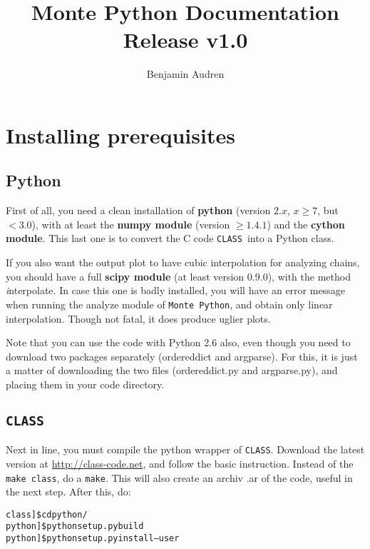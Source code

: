 \documentclass[10pt]{article}
\title{ {\huge \bf Monte Python Documentation}\\Release v1.0}
\author{Benjamin Audren}
\newcommand{\CLASS}{\texttt{CLASS}}
\newcommand{\MP}{\texttt{Monte Python}}
\begin{document}
\maketitle

\newpage

\tableofcontents

\newpage

\section{Installing prerequisites}

  \subsection{Python}

  First of all, you need a clean installation of {\bf python} (version $2.x$,
  $x\geq7$, but $<3.0$), with at least the {\bf numpy module} (version
  $\geq1.4.1$) and the {\bf cython module}. This last one is to convert the C
  code \CLASS~into a Python class.\par

  If you also want the output plot to have cubic interpolation for analyzing
  chains, you should have a full {\bf scipy module} (at least version $0.9.0$),
  with the method {\emph interpolate}. In case this one is badly installed, you
  will have an error message when running the analyze module of \MP,
  and obtain only linear interpolation. Though not fatal, it does produce
  uglier plots.\par

  Note that you can use the code with Python 2.6 also, even though you need to
  download two packages separately (ordereddict and argparse). For this, it is
  just a matter of downloading the two files (ordereddict.py and argparse.py),
  and placing them in your code directory.\par

  \subsection{\CLASS}

  Next in line, you must compile the python wrapper of \CLASS. Download the
  latest version at \url{http://class-code.net}, and follow the basic
  instruction. Instead of the \verb?make class?, do a \verb?make?. This will
  also create an archiv .ar of the code, useful in the next step. After this, do:

  \begin{alltt}
   class]\$ cd python/
   python]\$ python setup.py build
   python]\$ python setup.py install --user
  \end{alltt}
\end{document}
